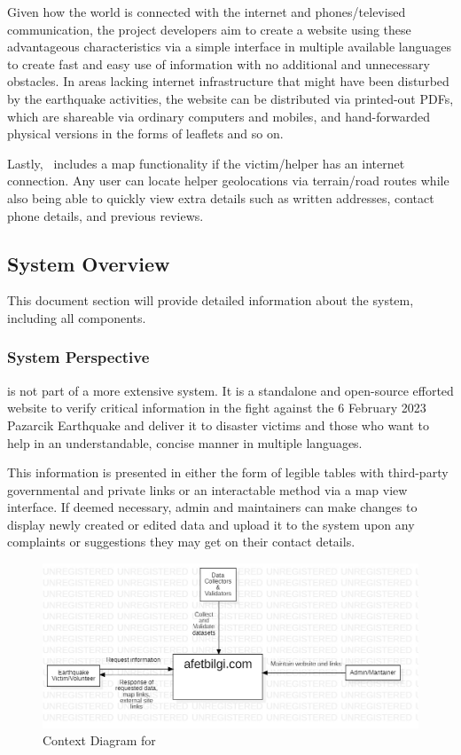 Given how the world is connected with the internet and phones/televised communication, the project developers aim to create a website using these advantageous characteristics via a simple interface in multiple available languages to create fast and easy use of information with no additional and unnecessary obstacles. In areas lacking internet infrastructure that might have been disturbed by the earthquake activities, the website can be distributed via printed-out PDFs, which are shareable via ordinary computers and mobiles, and hand-forwarded physical versions in the forms of leaflets and so on.

Lastly, \afetbilgi\ includes a map functionality if the victim/helper has an internet connection. Any user can locate helper geolocations via terrain/road routes while also being able to quickly view extra details such as written addresses, contact phone details, and previous reviews.

\subsection{System Overview}

This document section will provide detailed information about the system, including all components.

\subsubsection{System Perspective}

\afetbilgi \cite{afetbilgi} is not part of a more extensive system. It is a standalone and open-source efforted website to verify critical information in the fight against the 6 February 2023 Pazarcik Earthquake and deliver it to disaster victims and those who want to help in an understandable, concise manner in multiple languages.

This information is presented in either the form of legible tables with third-party governmental and private links or an interactable method via a map view interface. If deemed necessary, admin and maintainers can make changes to display newly created or edited data and upload it to the system upon any complaints or suggestions they may get on their contact details.

\begin{figure}[H]
  \centering
  \includegraphics[width=\linewidth]{img/context-diagram.jpg}
  \caption{Context Diagram for \afetbilgi}
\end{figure}

